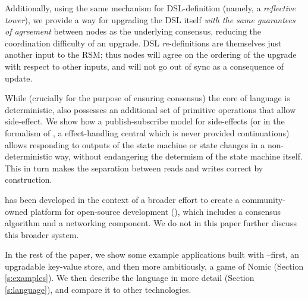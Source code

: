 Additionally, using the same mechanism for DSL-definition (namely, a
\textit{reflective tower}), we provide a way for upgrading the DSL itself
\textit{with the same guarantees of agreement} between nodes as the underlying
consensus, reducing the coordination difficulty of an upgrade. DSL
\textit{re}-definitions are themselves just another input to the RSM; thus
nodes will agree on the ordering of the upgrade with respect to other inputs,
and will not go out of sync as a consequence of update.

While (crucially for the purpose of ensuring consensus) the core of language is
deterministic, \rad also possesses an additional set of primitive operations
that allow side-effect. We show how a publish-subscribe model for side-effects
(or in the formalism of \cite{Cartwright1994}, a effect-handling central which
is never provided continuations) allows responding to outputs of the state
machine or state changes in a non-deterministic way, without endangering the
determism of the state machine itself. This in turn makes the separation
between reads and writes correct by construction.

\rad has been developed in the context of a broader effort to create a
community-owned platform for open-source development (\oscoin{}), which
includes a consensus algorithm and a networking component. We do not in this
paper further discuss this broader system.

In the rest of the paper, we show some example applications built with
\rad--first, an upgradable key-value store, and then more ambitiously, a game
of Nomic (Section \ref{s:examples}). We then describe the language in more
detail (Section \ref{s:language}), and compare it to other technologies.
